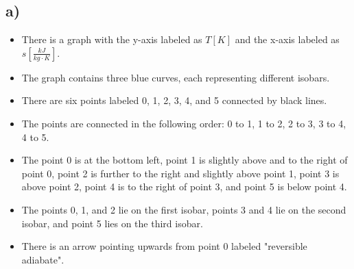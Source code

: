 

\subsection*{a)}

\begin{itemize}
    \item There is a graph with the y-axis labeled as \( T [K] \) and the x-axis labeled as \( s \left[ \frac{kJ}{kg \cdot K} \right] \). 
    \item The graph contains three blue curves, each representing different isobars.
    \item There are six points labeled 0, 1, 2, 3, 4, and 5 connected by black lines.
    \item The points are connected in the following order: 0 to 1, 1 to 2, 2 to 3, 3 to 4, 4 to 5.
    \item The point 0 is at the bottom left, point 1 is slightly above and to the right of point 0, point 2 is further to the right and slightly above point 1, point 3 is above point 2, point 4 is to the right of point 3, and point 5 is below point 4.
    \item The points 0, 1, and 2 lie on the first isobar, points 3 and 4 lie on the second isobar, and point 5 lies on the third isobar.
    \item There is an arrow pointing upwards from point 0 labeled "reversible adiabate".
\end{itemize}